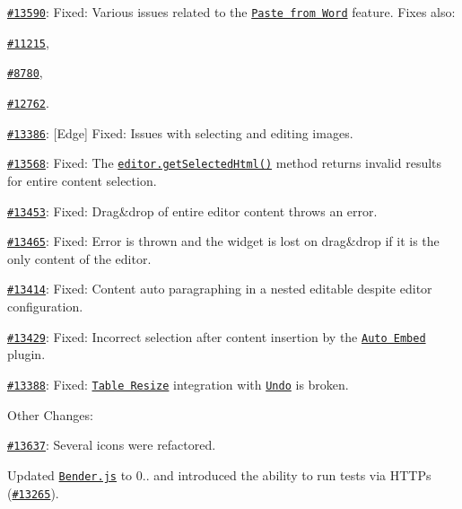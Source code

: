 \begin{DoxyItemize}
\item \href{http://dev.ckeditor.com/ticket/13590}{\tt \#13590}\+: Fixed\+: Various issues related to the \href{http://ckeditor.com/addon/pastefromword}{\tt Paste from Word} feature. Fixes also\+:
\begin{DoxyItemize}
\item \href{http://dev.ckeditor.com/ticket/11215}{\tt \#11215},
\item \href{http://dev.ckeditor.com/ticket/8780}{\tt \#8780},
\item \href{http://dev.ckeditor.com/ticket/12762}{\tt \#12762}.
\end{DoxyItemize}
\item \href{http://dev.ckeditor.com/ticket/13386}{\tt \#13386}\+: \mbox{[}Edge\mbox{]} Fixed\+: Issues with selecting and editing images.
\item \href{http://dev.ckeditor.com/ticket/13568}{\tt \#13568}\+: Fixed\+: The \href{http://docs.ckeditor.com/#!/api/CKEDITOR.editor-method-getSelectedHtml}{\tt {\ttfamily editor.\+get\+Selected\+Html()}} method returns invalid results for entire content selection.
\item \href{http://dev.ckeditor.com/ticket/13453}{\tt \#13453}\+: Fixed\+: Drag\&drop of entire editor content throws an error.
\item \href{http://dev.ckeditor.com/ticket/13465}{\tt \#13465}\+: Fixed\+: Error is thrown and the widget is lost on drag\&drop if it is the only content of the editor.
\item \href{http://dev.ckeditor.com/ticket/13414}{\tt \#13414}\+: Fixed\+: Content auto paragraphing in a nested editable despite editor configuration.
\item \href{http://dev.ckeditor.com/ticket/13429}{\tt \#13429}\+: Fixed\+: Incorrect selection after content insertion by the \href{http://ckeditor.com/addon/autoembed}{\tt Auto Embed} plugin.
\item \href{http://dev.ckeditor.com/ticket/13388}{\tt \#13388}\+: Fixed\+: \href{http://ckeditor.com/addon/tableresize}{\tt Table Resize} integration with \href{http://ckeditor.com/addon/undo}{\tt Undo} is broken.
\end{DoxyItemize}

Other Changes\+:


\begin{DoxyItemize}
\item \href{https://dev.ckeditor.com/ticket/13637}{\tt \#13637}\+: Several icons were refactored.
\item Updated \href{https://github.com/benderjs/benderjs}{\tt Bender.\+js} to 0.. and introduced the ability to run tests via H\+T\+T\+Ps (\href{https://dev.ckeditor.com/ticket/13265}{\tt \#13265}).
\end{DoxyItemize}

